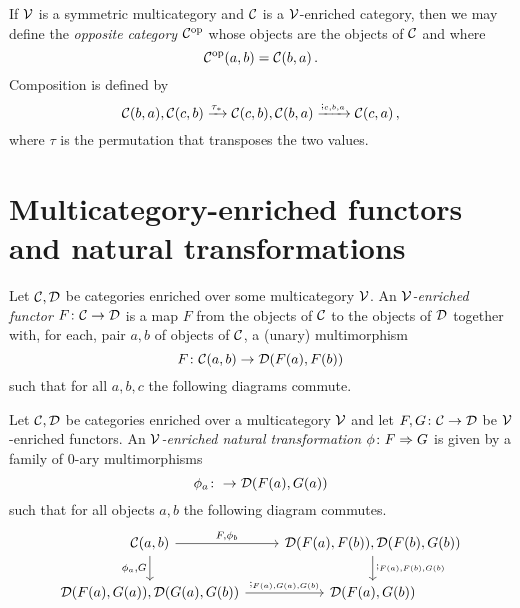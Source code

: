 \begin{remark}
  If ${\mathcal{V}}$ is a symmetric multicategory and ${\mathcal{C}}$ is a ${\mathcal{V}}$-enriched category, then we may define the \emph{opposite category} ${\mathcal{C}}^{\mathrm{op}}$ whose objects are the objects of ${\mathcal{C}}$ and where
  \[
    {\mathcal{C}}^{\mathrm{op}}(a,b)={\mathcal{C}}(b,a)\,.
    \]
  Composition is defined by
  \[
    {\mathcal{C}}(b,a),{\mathcal{C}}(c,b) \xrightarrow{\tau_*}
    {\mathcal{C}}(c,b),{\mathcal{C}}(b,a) \xrightarrow{;_{c,b,a}}
    {\mathcal{C}}(c,a)\,,
    \]
  where $\tau$ is the permutation that transposes the two values.
\end{remark}

\section{Multicategory-enriched functors and natural transformations}

\begin{definition}
  Let ${\mathcal{C}},{\mathcal{D}}$ be categories enriched over some multicategory ${\mathcal{V}}$.  
  An \emph{${\mathcal{V}}$-enriched functor} $F \colon {\mathcal{C}} \to {\mathcal{D}}$ is a map $F$ from the objects of ${\mathcal{C}}$ to the objects of ${\mathcal{D}}$ together with, for each, pair $a,b$ of objects of ${\mathcal{C}}$, a (unary) multimorphism
  \[
    F \colon {\mathcal{C}}(a,b) \to {\mathcal{D}}(F(a),F(b))
    \]
  such that for all $a, b, c$ the following diagrams commute.
\end{definition}

\begin{definition}
  Let ${\mathcal{C}},{\mathcal{D}}$ be categories enriched over a multicategory ${\mathcal{V}}$ and let $F,G\colon {\mathcal{C}} \to {\mathcal{D}}$ be ${\mathcal{V}}$-enriched functors.
  An \emph{${\mathcal{V}}$-enriched natural transformation} $\phi\colon F \Rightarrow G$ is given by a family of $0$-ary multimorphisms
  \[
    \phi_a \colon \to {\mathcal{D}}(F(a),G(a))
    \]
  such that for all objects $a,b$ the following diagram commutes.
  \[
    \begin{tikzcd}
      \C(a,b) \arrow[r, "{F,\phi_b}"] \arrow[d, "{\phi_a,G}"']
        & \D(F(a),F(b)),\D(F(b),G(b)) \arrow[d, "{;_{F(a),F(b),G(b)}}"] \\
      \D(F(a),G(a)),\D(G(a),G(b)) \arrow[r, "{;_{F(a),G(a),G(b)}}"]
        & \D(F(a), G(b))
    \end{tikzcd}
    \]
\end{definition}

